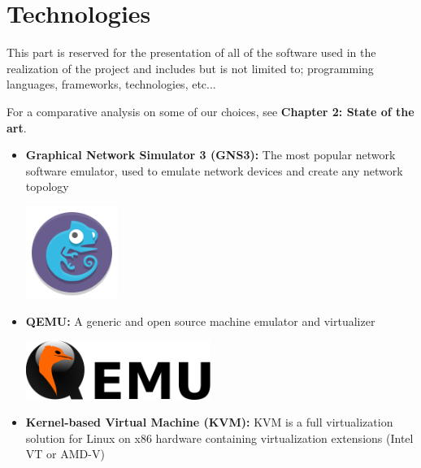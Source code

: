 \section{Technologies}
This part is reserved for the presentation of all of the software used in the realization of the project and includes but is not limited to; programming languages, frameworks, technologies, etc...

\medskip
For a comparative analysis on some of our choices, see \textbf {Chapter 2: State of the art}.

\begin{itemize}
    \item \textbf{Graphical Network Simulator 3 (GNS3):} \newline The most popular network software emulator, used to emulate network devices and create any network topology \newline
          \begin{minipage}{\linewidth}
              \centering
              \includegraphics[width=3cm]{src/assets/logos/gns3_94911_500x500.png}
          \end{minipage}
    \item \textbf{QEMU:} \newline \cite{qemu} A generic and open source machine emulator and virtualizer \newline \newline
          \begin{minipage}{\linewidth}
              \centering
              \includegraphics[width=6cm]{src/assets/logos/qemu_logo.png}
          \end{minipage}
          \newline
    \item \textbf{Kernel-based Virtual Machine (KVM):} \newline \cite{kvm} KVM is a full virtualization solution for Linux on x86 hardware containing virtualization extensions (Intel VT or AMD-V) \newline \newline

\end{itemize}
